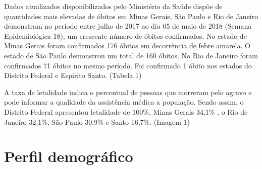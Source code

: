 \documentclass{article}
\begin{document}
\begin{multicols*}{2}
	{\large%
    
    
	Dados atualizados disponibilizados pelo Ministério da Saúde dispõe de quantidades mais elevadas de óbitos em Minas Gerais, São Paulo e Rio de Janeiro demonstram no período entre julho de 2017 ao dia 05 de maio de 2018 (Semana Epidemiológica 18), um crescente número de óbitos confirmados.
	No estado de Minas Gerais foram confirmados 176 óbitos em decorrência de febre amarela. O estado de São Paulo demonstrou um total de 160 óbitos. No Rio de Janeiro foram confirmados 71 óbitos no mesmo período. Foi confirmado 1 óbito nos estados do Distrito Federal e Espirito Santo. (Tabela 1)

	A taxa de letalidade indica o percentual de pessoas que morreram pelo agravo e pode informar a qualidade da assistência médica a população. Sendo assim, o Distrito Federal apresentou letalidade de 100\%, Minas Gerais 34,1\% , o Rio de Janeiro 32,1\%, São Paulo 30,9\% e Santo 16,7\%. (Imagem 1)
} %





\section*{Perfil demográfico}%

	{\large %
    
     
}
\end{multicols*}
\end{document}
